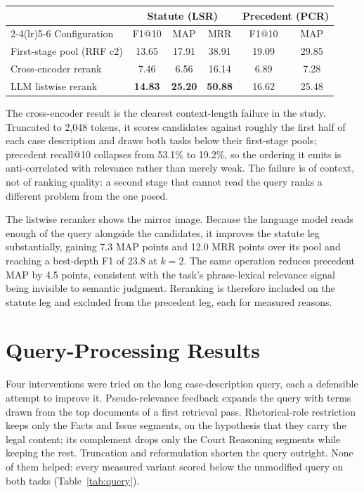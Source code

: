 \documentclass{mnnit}
\makeatletter
\newcommand{\tabcaption}[1]{\def\@captype{table}\caption{#1}}
\makeatother
\begin{document}
\begin{center}
\small
\tabcaption{Second-stage reranking over the fused top-50 pool.
The listwise reranker reads the query (up to 4,000 characters)
beside 20 numbered snippets.}
\label{tab:rerank}
\vspace{2mm}
\begin{tabular}{lccccc}
\toprule
 & \multicolumn{3}{c}{Statute (LSR)} & \multicolumn{2}{c}{Precedent (PCR)} \\
\cmidrule(lr){2-4}\cmidrule(lr){5-6}
Configuration & F1@10 & MAP & MRR & F1@10 & MAP \\
\midrule
First-stage pool (RRF c2) & 13.65 & 17.91 & 38.91 & 19.09 & 29.85 \\
Cross-encoder rerank & 7.46 & 6.56 & 16.14 & 6.89 & 7.28 \\
LLM listwise rerank & \textbf{14.83} & \textbf{25.20} & \textbf{50.88} & 16.62 & 25.48 \\
\bottomrule
\end{tabular}
\end{center}

The cross-encoder result is the clearest context-length failure
in the study. Truncated to 2,048 tokens, it scores candidates
against roughly the first half of each case description and draws
both tasks below their first-stage pools; precedent recall@10
collapses from 53.1\% to 19.2\%, so the ordering it emits is
anti-correlated with relevance rather than merely weak. The
failure is of context, not of ranking quality: a second stage
that cannot read the query ranks a different problem from the one
posed.

The listwise reranker shows the mirror image. Because the
language model reads enough of the query alongside the
candidates, it improves the statute leg substantially, gaining
7.3 MAP points and 12.0 MRR points over its pool and reaching a
best-depth F1 of 23.8 at $k{=}2$. The same operation reduces
precedent MAP by 4.5 points, consistent with the task's
phrase-lexical relevance signal being invisible to semantic
judgment. Reranking is therefore included on the statute leg and
excluded from the precedent leg, each for measured reasons.

\section{Query-Processing Results}
Four interventions were tried on the long case-description
query, each a defensible attempt to improve it.
Pseudo-relevance feedback expands the query with terms drawn
from the top documents of a first retrieval pass.
Rhetorical-role restriction keeps only the Facts and Issue
segments, on the hypothesis that they carry the legal content;
its complement drops only the Court Reasoning segments while
keeping the rest. Truncation and reformulation shorten the
query outright. None of them helped: every measured variant
scored below the unmodified query on both tasks
(Table~\ref{tab:query}).
\end{document}
